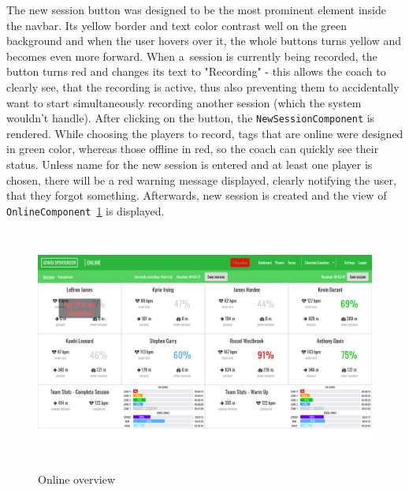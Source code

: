 The new session button was designed to be the most prominent element inside the navbar. Its yellow border and text color contrast well on the green background and when the user hovers over it, the whole buttons turns yellow and becomes even more forward. When a~session is currently being recorded, the button turns red and changes its text to "Recording" - this allows the coach to clearly see, that the recording is active, thus also preventing them to accidentally want to start simultaneously recording another session (which the system wouldn’t handle). After clicking on the button, the \texttt{NewSessionComponent} is rendered. While choosing the players to record, tags that are online were designed in green color, whereas those offline in red, so the coach can quickly see their status. Unless name for the new session is entered and at least one player is chosen, there will be a red warning message displayed, clearly notifying the user, that they forgot something. Afterwards, new session is created and the view of \texttt{OnlineComponent}~\ref{img:online_implem} is displayed.

\begin{figure}[htb]
\begin{center}
  \includegraphics*[width=14cm,height=8cm,keepaspectratio]{images/online_implem}
\end{center}
\caption{Online overview}
\label{img:online_implem}
\end{figure}


